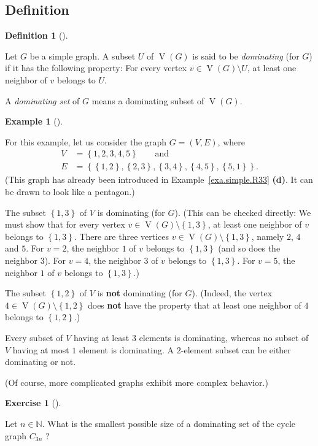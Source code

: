 \documentclass[numbers=enddot,12pt,final,onecolumn,notitlepage]{scrartcl}%
\theoremstyle{definition}
\newtheorem{defi}[theo]{Definition}
\newenvironment{definition}[1][]
{\begin{defi}[#1]\begin{leftbar}}
{\end{leftbar}\end{defi}}
\newtheorem{exam}[theo]{Example}
\newenvironment{example}[1][]
{\begin{exam}[#1]\begin{leftbar}}
{\end{leftbar}\end{exam}}
\newtheorem{exmp}[theo]{Exercise}
\newenvironment{exercise}[1][]
{\begin{exmp}[#1]\begin{leftbar}}
{\end{leftbar}\end{exmp}}
\newcommand{\NN}{\mathbb{N}}
\newcommand{\set}[1]{\left\{ #1 \right\}}
\newcommand{\tup}[1]{\left( #1 \right)}
\newcommand{\verts}[1]{\operatorname{V}\left( #1 \right)}
\begin{document}
\subsection{\label{subsect.dominating.defs}Definition}

\begin{definition} \label{def.dominating}
Let $G$ be a simple graph. A subset $U$ of $\verts{G}$ is said to be
\textit{dominating} (for $G$) if it has the following property: For
every vertex $v \in \verts{G} \setminus U$, at least one neighbor of
$v$ belongs to $U$.

A \textit{dominating set} of $G$ means a dominating subset of
$\verts{G}$.
\end{definition}

\begin{example}
For this example, let us consider the graph $G = \tup{V, E}$, where
\begin{align*}
V &= \set{1, 2, 3, 4, 5} \qquad \text{and} \\
E &= \set{\set{1,2}, \set{2,3}, \set{3,4}, \set{4,5}, \set{5,1}} .
\end{align*}
(This graph has already been introduced in
Example~\ref{exa.simple.R33} \textbf{(d)}. It can be drawn to look
like a pentagon.)

The subset $\set{1, 3}$ of $V$ is dominating (for $G$). (This can be
checked directly: We must show that
for every vertex $v \in \verts{G} \setminus \set{1, 3}$, at least
one neighbor of $v$ belongs to $\set{1, 3}$. There are three vertices
$v \in \verts{G} \setminus \set{1, 3}$, namely $2$, $4$ and $5$. For
$v = 2$, the neighbor $1$ of $v$ belongs to $\set{1, 3}$ (and so does
the neighbor $3$). For $v = 4$, the neighbor $3$ of $v$ belongs to
$\set{1, 3}$. For $v = 5$, the neighbor $1$ of $v$ belongs to
$\set{1, 3}$.)

The subset $\set{1, 2}$ of $V$ is \textbf{not} dominating (for $G$).
(Indeed, the vertex $4 \in \verts{G} \setminus \set{1, 2}$ does
\textbf{not} have the property that at least one neighbor of $4$
belongs to $\set{1, 2}$.)

Every subset of $V$ having at least $3$ elements is dominating,
whereas no subset of $V$ having at most $1$ element is dominating.
A $2$-element subset can be either dominating or not.

(Of course, more complicated graphs exhibit more complex behavior.)
\end{example}

\begin{exercise}
Let $n \in \NN$. What is the smallest possible size of a dominating
set of the cycle graph $C_{3n}$ ?
\end{exercise}
\end{document}
